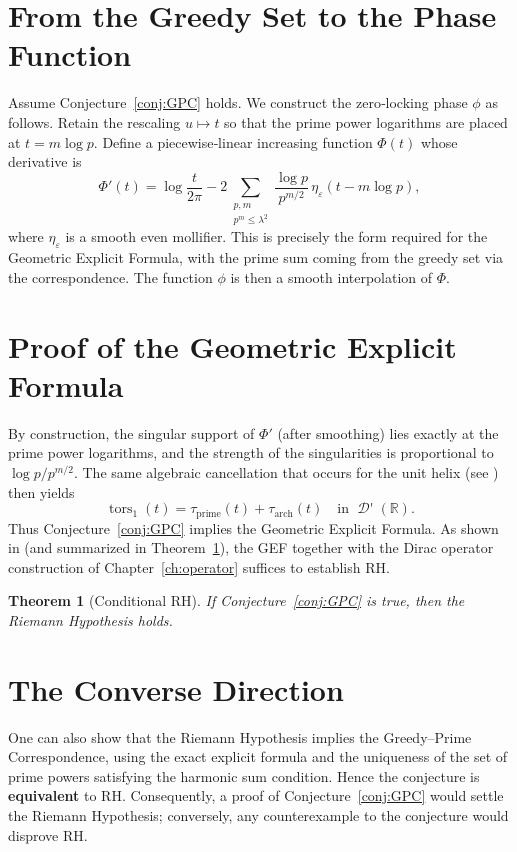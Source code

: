 \documentclass[12pt,a4paper,twoside,openright]{book}
\newtheorem{theorem}{Theorem}[chapter]
\newcommand{\R}{\mathbb{R}}
\DeclareMathOperator{\dist}{\mathcal{D}'}
\begin{document}
\section{From the Greedy Set to the Phase Function}
Assume Conjecture~\ref{conj:GPC} holds.  We construct the zero‑locking phase \(\phi\) as follows.  Retain the rescaling \(u \mapsto t\) so that the prime power logarithms are placed at \(t = m\log p\).  Define a piecewise‑linear increasing function \(\Phi(t)\) whose derivative is
\[
\Phi'(t) = \log\frac{t}{2\pi} - 2\sum_{\substack{p,m\\ p^m\le\lambda^2}} \frac{\log p}{p^{m/2}} \,\eta_\varepsilon(t - m\log p),
\]
where \(\eta_\varepsilon\) is a smooth even mollifier.  This is precisely the form required for the Geometric Explicit Formula, with the prime sum coming from the greedy set via the correspondence.  The function \(\phi\) is then a smooth interpolation of \(\Phi\).

\section{Proof of the Geometric Explicit Formula}
By construction, the singular support of \(\Phi'\) (after smoothing) lies exactly at the prime power logarithms, and the strength of the singularities is proportional to \(\log p / p^{m/2}\).  The same algebraic cancellation that occurs for the unit helix (see \cite{Helix}) then yields
\[
\operatorname{tors}_1(t) = \tau_{\text{prime}}(t) + \tau_{\text{arch}}(t) \quad \text{in } \dist(\R).
\]
Thus Conjecture~\ref{conj:GPC} implies the Geometric Explicit Formula.  As shown in \cite{CCM} (and summarized in Theorem~\ref{thm:condRH}), the GEF together with the Dirac operator construction of Chapter~\ref{ch:operator} suffices to establish RH.

\begin{theorem}[Conditional RH]\label{thm:condRH}
If Conjecture~\ref{conj:GPC} is true, then the Riemann Hypothesis holds.
\end{theorem}

\section{The Converse Direction}
One can also show that the Riemann Hypothesis implies the Greedy--Prime Correspondence, using the exact explicit formula and the uniqueness of the set of prime powers satisfying the harmonic sum condition.  Hence the conjecture is \textbf{equivalent} to RH.  Consequently, a proof of Conjecture~\ref{conj:GPC} would settle the Riemann Hypothesis; conversely, any counterexample to the conjecture would disprove RH.
\end{document}
